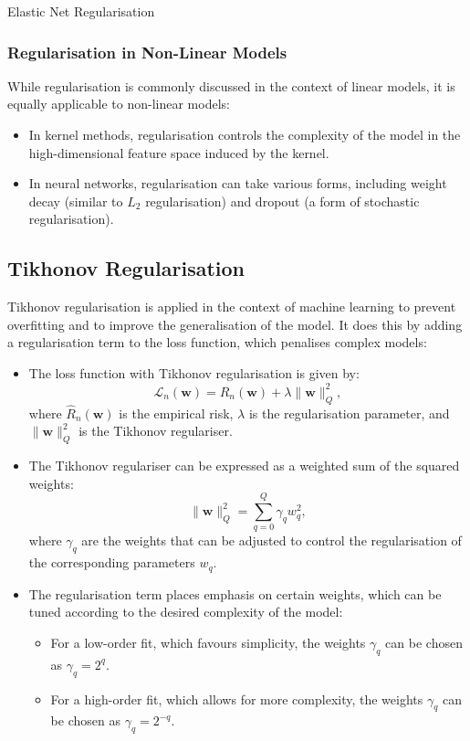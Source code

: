 \begin{sidenotebox}{Elastic Net Regularisation}
\subsubsection*{Regularisation in Non-Linear Models}
While regularisation is commonly discussed in the context of linear models, it is equally applicable to non-linear models:

\begin{itemize}
    \item In kernel methods, regularisation controls the complexity of the model in the high-dimensional feature space induced by the kernel.
    \item In neural networks, regularisation can take various forms, including weight decay (similar to \( L_2 \) regularisation) and dropout (a form of stochastic regularisation).
\end{itemize}
\end{sidenotebox}

\subsection{Tikhonov Regularisation}

Tikhonov regularisation is applied in the context of machine learning to prevent overfitting and to improve the generalisation of the model. It does this by adding a regularisation term to the loss function, which penalises complex models:

\begin{itemize}
    \item The loss function with Tikhonov regularisation is given by:
    \[
    \mathcal{L}_n(\mathbf{w}) = \hat{R}_n(\mathbf{w}) + \lambda \|\mathbf{w}\|_Q^2,
    \]
    where \( \hat{R}_n(\mathbf{w}) \) is the empirical risk, \( \lambda \) is the regularisation parameter, and \( \|\mathbf{w}\|_Q^2 \) is the Tikhonov regulariser.
    
    \item The Tikhonov regulariser can be expressed as a weighted sum of the squared weights:
    \[
    \|\mathbf{w}\|_Q^2 = \sum_{q=0}^{Q} \gamma_q w_q^2,
    \]
    where \( \gamma_q \) are the weights that can be adjusted to control the regularisation of the corresponding parameters \( w_q \).

    \item The regularisation term places emphasis on certain weights, which can be tuned according to the desired complexity of the model:
    \begin{itemize}
        \item For a low-order fit, which favours simplicity, the weights \( \gamma_q \) can be chosen as \( \gamma_q = 2^q \).
        \item For a high-order fit, which allows for more complexity, the weights \( \gamma_q \) can be chosen as \( \gamma_q = 2^{-q} \).
    \end{itemize}
\end{itemize}


